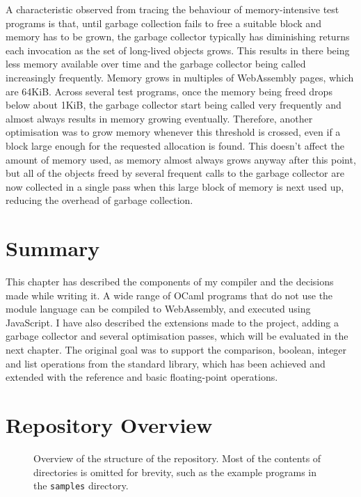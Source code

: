 A characteristic observed from tracing the behaviour of memory-intensive test programs is that, until garbage collection fails to free a suitable block and memory has to be grown, the garbage collector typically has diminishing returns each invocation as the set of long-lived objects grows. This results in there being less memory available over time and the garbage collector being called increasingly frequently. Memory grows in multiples of WebAssembly pages, which are 64KiB. Across several test programs, once the memory being freed drops below about 1KiB, the garbage collector start being called very frequently and almost always results in memory growing eventually. Therefore, another optimisation was to grow memory whenever this threshold is crossed, even if a block large enough for the requested allocation is found. This doesn't affect the amount of memory used, as memory almost always grows anyway after this point, but all of the objects freed by several frequent calls to the garbage collector are now collected in a single pass when this large block of memory is next used up, reducing the overhead of garbage collection.


\newpage
\section{Summary}
This chapter has described the components of my compiler and the decisions made while writing it. A wide range of OCaml programs that do not use the module language can be compiled to WebAssembly, and executed using JavaScript. I have also described the extensions made to the project, adding a garbage collector and several optimisation passes, which will be evaluated in the next chapter. The original goal was to support the comparison, boolean, integer and list operations from the standard library, which has been achieved and extended with the reference and basic floating-point operations.


\section{Repository Overview}
\begin{figure}[H]
\caption{Overview of the structure of the repository. Most of the contents of directories is omitted for brevity, such as the example programs in the \texttt{samples} directory.}
\end{figure}



